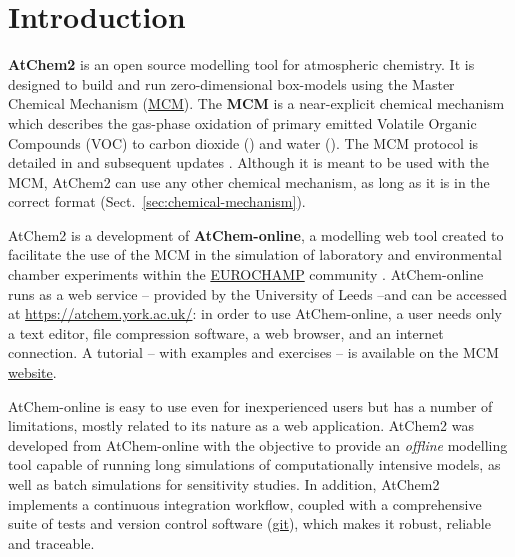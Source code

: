 %
%
%
%

\chapter{Introduction} \label{ch:introduction}

\textbf{AtChem2} is an open source modelling tool for atmospheric
chemistry. It is designed to build and run zero-dimensional
box-models using the Master Chemical Mechanism
(\href{http://mcm.york.ac.uk}{MCM}).  The \textbf{MCM} is a
near-explicit chemical mechanism which describes the gas-phase
oxidation of primary emitted Volatile Organic Compounds (VOC) to
carbon dioxide () and water (). The MCM protocol is
detailed in \citet{jenkin_1997} and subsequent updates
\citep{saunders_2003, jenkin_2003, bloss_2005, jenkin_2015}. Although
it is meant to be used with the MCM, AtChem2 can use any other
chemical mechanism, as long as it is in the correct format
(Sect.~\ref{sec:chemical-mechanism}).

AtChem2 is a development of \textbf{AtChem-online}, a modelling web
tool created to facilitate the use of the MCM in the simulation of
laboratory and environmental chamber experiments within the
\href{https://www.eurochamp.org}{EUROCHAMP} community
\citep{martin_2009}. AtChem-online runs as a web service -- provided
by the University of Leeds --and can be accessed at
\href{https://atchem.york.ac.uk/}{https://atchem.york.ac.uk/}:
in order to use AtChem-online, a user needs only a text editor, file
compression software, a web browser, and an internet connection. A
tutorial -- with examples and exercises -- is available on the MCM
\href{http://mcm.york.ac.uk/atchem/tutorial_intro.htt}{website}.

AtChem-online is easy to use even for inexperienced users but has a
number of limitations, mostly related to its nature as a web
application. AtChem2 was developed from AtChem-online with the
objective to provide an \emph{offline} modelling tool capable of
running long simulations of computationally intensive models, as well
as batch simulations for sensitivity studies. In addition, AtChem2
implements a continuous integration workflow, coupled with a
comprehensive suite of tests and version control software
(\href{https://git-scm.com}{git}), which makes it robust, reliable
and traceable.

